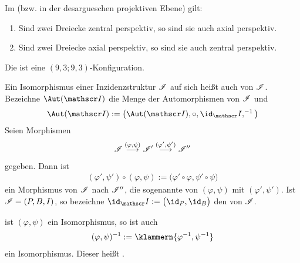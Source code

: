 \begin{theorem}\enter
	Im  (bzw. in der desargueschen projektiven Ebene) gilt:
	\begin{enumerate}
		\item Sind zwei Dreiecke zentral perspektiv, so sind sie auch axial perspektiv.
		\item Sind zwei Dreiecke axial perspektiv, so sind sie auch zentral perspektiv.
	\end{enumerate}
\end{theorem}

\begin{beispiel}\enter
	Die  ist eine $(9,3;9,3)$-Konfiguration.
\end{beispiel}

\begin{definition}
	Ein Isomorphismus einer Inzidenzstruktur $\mathscr{I}$ auf sich heißt auch  von $\mathscr{I}$.
	Bezeichne $\Aut(\Inz)$ die Menge der Automorphismen von $\mathscr{I}$ und
	\begin{align*}
		\Aut(\Inz):=\big(\Aut(\Inz),\circ,\id_\Inz,^{-1}\big)
	\end{align*}
	Seien Morphismen
	\begin{align*}
		\mathscr{I}\overset{(\varphi,\psi)}{\longrightarrow}\mathscr{I}'\overset{(\varphi',\psi')}{\longrightarrow}\mathscr{I}''
	\end{align*}		
	gegeben. Dann ist
	\begin{align*}
		(\varphi',\psi')\circ(\varphi,\psi):=\big(\varphi'\circ\varphi,\psi'\circ\psi\big)
	\end{align*}
	ein Morphismus von $\mathscr{I}$ nach $\mathscr{I}''$, die sogenannte   von $(\varphi,\psi)$ mit $(\varphi',\psi')$.
	\nl
	Ist $\mathscr{I}=(P,B,I)$, so bezeichne $\id_\Inz:=\big(\id_P,\id_B\big)$ den  von $\mathscr{I}$.
\end{definition}

\begin{lemma}
	ist $(\varphi,\psi)$ ein Isomorphismus, so ist auch 
	\begin{align*}
		(\varphi,\psi)^{-1}:=\klammern{\varphi^{-1},\psi^{-1}}
	\end{align*}
	ein Isomorphismus.
	Dieser heißt .
\end{lemma}









